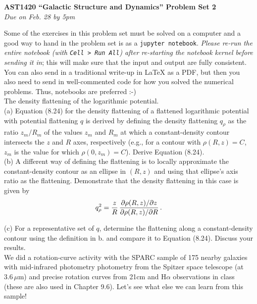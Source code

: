 \documentclass[12pt]{article}
\begin{document}
\begin{center}
{\bf \LARGE AST1420 ``Galactic Structure and Dynamics'' Problem Set 2}\\[7pt]
\emph{Due on Feb. 28 by 5pm}\\[7pt]
\end{center}

Some of the exercises in this problem set must be solved on a computer
and a good way to hand in the problem set is as a \texttt{jupyter
  notebook}. \emph{Please re-run the entire notebook (with \texttt{Cell
    > Run All}) after re-starting the notebook kernel before sending
  it in}; this will make sure that the input and output are fully
consistent. You can also send in a traditional write-up in LaTeX as a PDF, 
but then you also need to send in well-commented code for how you solved 
the numerical problems. Thus, notebooks are preferred :-)\\

 The density flattening of the logarithmic potential.\\

(a) Equation (8.24) for the density flattening of a flattened logarithmic potential with 
potential flattening \(q\) is derived by defining the density flattening \(q_\rho\) as 
the ratio \(z_m/R_m\) of the values \(z_m\) and \(R_m\) at which a constant-density 
contour intersects the \(z\) and \(R\) axes, respectively (e.g., for a contour with 
\(\rho(R,z) = C\), \(z_m\) is the value for which \(\rho(0,z_m) = C\)). Derive Equation 
(8.24).\\

(b) A different way of defining the flattening is to locally approximate the 
constant-density contour as an ellipse in \((R,z)\) and using that ellipse's axis ratio 
as the flattening. Demonstrate that the density flattening in this case is given by
\begin{equation*}
\begin{split}q_\rho^2 = {z\over R}\,{\partial \rho(R,z) / \partial z \over \partial \rho(R,z) / \partial R}\,.\end{split}
\end{equation*}

(c) For a representative set of \(q\), determine the flattening along a constant-density 
contour using the definition in b. and compare it to Equation (8.24). Discuss your results.\\

 We did a rotation-curve activity with the SPARC sample of 175 
nearby galaxies with mid-infrared photometry photometry from the Spitzer space telescope 
(at \(3.6\,\mu\mathrm{m}\)) and precise rotation curves from 21cm and H\(\alpha\) 
observations in class (these are also used in Chapter 9.6). Let's see what else we can 
learn from this sample!\\
\end{document}
